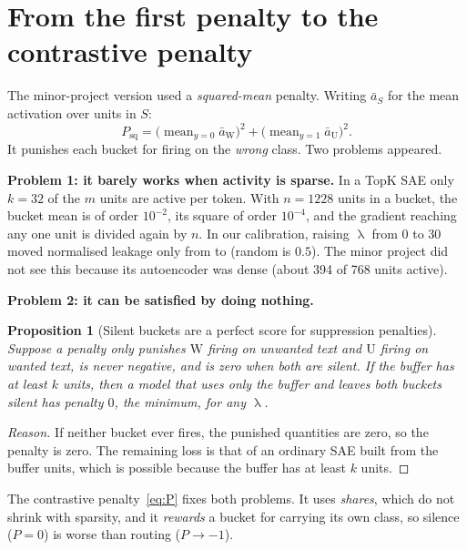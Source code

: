 \documentclass[11pt,a4paper]{article}
\newtheorem{proposition}{Proposition}
\theoremstyle{definition}
\newcommand{\Wb}{\mathrm{W}}
\newcommand{\Ub}{\mathrm{U}}
\newcommand{\avg}{\operatorname{mean}}
\begin{document}
\section{From the first penalty to the contrastive penalty}
\label{sec:penform}

The minor-project version used a \emph{squared-mean} penalty. Writing $\bar a_S$ for the mean
activation over units in $S$:
\begin{equation}
  P_{\mathrm{sq}}=\big(\avg_{y=0}\bar a_{\Wb}\big)^2+\big(\avg_{y=1}\bar a_{\Ub}\big)^2 .
\end{equation}
It punishes each bucket for firing on the \emph{wrong} class. Two problems appeared.

\textbf{Problem 1: it barely works when activity is sparse.} In a TopK SAE only $k=32$ of the $m$
units are active per token. With $n=1228$ units in a bucket, the bucket mean is of order $10^{-2}$,
its square of order $10^{-4}$, and the gradient reaching any one unit is divided again by $n$. In
our calibration, raising $\uplambda$ from $0$ to $30$ moved normalised leakage only from
\sqLeakLamZero{} to \sqLeakLamThirty{} (random is $0.5$). The minor project did not see this
because its autoencoder was dense (about 394 of 768 units active).

\textbf{Problem 2: it can be satisfied by doing nothing.}

\begin{proposition}[Silent buckets are a perfect score for suppression penalties]
Suppose a penalty only punishes $\Wb$ firing on unwanted text and $\Ub$ firing on wanted text, is
never negative, and is zero when both are silent. If the buffer has at least $k$ units, then a
model that uses only the buffer and leaves both buckets silent has penalty $0$, the minimum, for
any $\uplambda$.
\end{proposition}
\begin{proof}[Reason]
If neither bucket ever fires, the punished quantities are zero, so the penalty is zero. The
remaining loss is that of an ordinary SAE built from the buffer units, which is possible because
the buffer has at least $k$ units.
\end{proof}


The contrastive penalty~\eqref{eq:P} fixes both problems. It uses \emph{shares}, which do not
shrink with sparsity, and it \emph{rewards} a bucket for carrying its own class, so silence
($P=0$) is worse than routing ($P\to-1$).
\end{document}
